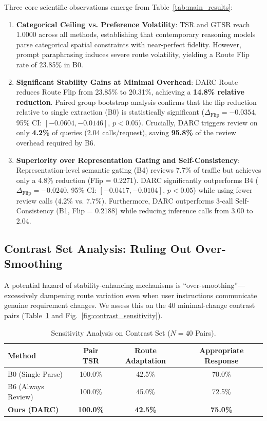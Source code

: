 \documentclass[conference]{IEEEtran}
\begin{document}
Three core scientific observations emerge from Table~\ref{tab:main_results}:
\begin{enumerate}
    \item \textbf{Categorical Ceiling vs. Preference Volatility}: TSR and GTSR reach 1.0000 across all methods, establishing that contemporary reasoning models parse categorical spatial constraints with near-perfect fidelity. However, prompt paraphrasing induces severe route volatility, yielding a Route Flip rate of 23.85\% in B0.
    \item \textbf{Significant Stability Gains at Minimal Overhead}: DARC-Route reduces Route Flip from 23.85\% to 20.31\%, achieving a \textbf{14.8\% relative reduction}. Paired group bootstrap analysis confirms that the flip reduction relative to single extraction (B0) is statistically significant ($\Delta_{\text{Flip}} = -0.0354$, 95\% CI: $[-0.0604, -0.0146]$, $p < 0.05$). Crucially, DARC triggers review on only \textbf{4.2\%} of queries (2.04 calls/request), saving \textbf{95.8\%} of the review overhead required by B6.
    \item \textbf{Superiority over Representation Gating and Self-Consistency}: Representation-level semantic gating (B4) reviews 7.7\% of traffic but achieves only a 4.8\% reduction (Flip = 0.2271). DARC significantly outperforms B4 ($\Delta_{\text{Flip}} = -0.0240$, 95\% CI: $[-0.0417, -0.0104]$, $p < 0.05$) while using fewer review calls (4.2\% vs. 7.7\%). Furthermore, DARC outperforms 3-call Self-Consistency (B1, Flip = 0.2188) while reducing inference calls from 3.00 to 2.04.
\end{enumerate}

\subsection{Contrast Set Analysis: Ruling Out Over-Smoothing}
A potential hazard of stability-enhancing mechanisms is ``over-smoothing''—excessively dampening route variation even when user instructions communicate genuine requirement changes. We assess this on the 40 minimal-change contrast pairs (Table~\ref{tab:contrast_results} and Fig.~\ref{fig:contrast_sensitivity}).

\begin{table}[h]
\centering
\caption{Sensitivity Analysis on Contrast Set ($N=40$ Pairs).}
\label{tab:contrast_results}
\small
\begin{tabular}{lccc}
\toprule
\textbf{Method} & \textbf{Pair TSR} & \textbf{Route Adaptation} & \textbf{Appropriate Response} \\
\midrule
B0 (Single Parse) & 100.0\% & 42.5\% & 70.0\% \\
B6 (Always Review) & 100.0\% & 45.0\% & 72.5\% \\
\textbf{Ours (DARC)} & \textbf{100.0\%} & \textbf{42.5\%} & \textbf{75.0\%} \\
\bottomrule
\end{tabular}
\end{table}
\end{document}
